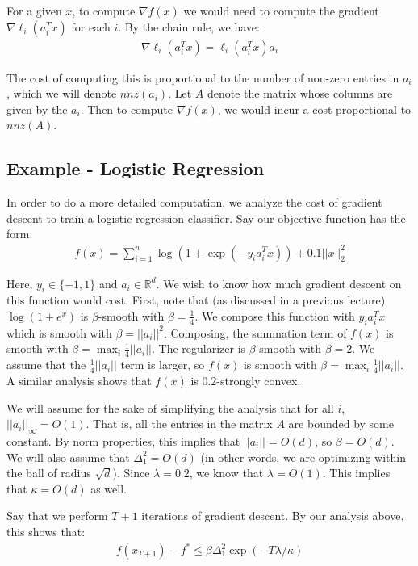 \documentclass[12pt]{report}
\def\real{\mathbb R}
\begin{document}
For a given $x$, to compute $\nabla f(x)$ we would need to compute the gradient $\nabla \ell_i(a_i^Tx)$ for each $i$. By the chain rule, we have:
\begin{align*}
\nabla \ell_i (a_i^Tx) = \ell_i(a_i^Tx)a_i\end{align*}

The cost of computing this is proportional to the number of non-zero entries in $a_i$, which we will denote $nnz(a_i)$. Let $A$ denote the matrix whose columns are given by the $a_i$. Then to compute $\nabla f(x)$, we would incur a cost proportional to $nnz(A)$.

\subsection{Example - Logistic Regression}

In order to do a more detailed computation, we analyze the cost of gradient descent to train a logistic regression classifier. Say our objective function has the form:
\begin{align*}
f(x) = \sum_{i=1}^n \log(1+\exp(-y_ia_i^Tx)) + 0.1||x||_2^2\end{align*}

Here, $y_i \in \{-1,1\}$ and $a_i \in \real^d$. We wish to know how much gradient descent on this function would cost. First, note that (as discussed in a previous lecture) $\log(1+e^x)$ is $\beta$-smooth with $\beta = \frac{1}{4}$. We compose this function with $y_ia_i^Tx$ which is smooth with $\beta = ||a_i||^2$. Composing, the summation term of $f(x)$ is smooth with $\beta = \max_i \frac{1}{4}||a_i||$. The regularizer is $\beta$-smooth with $\beta = 2$. We assume that the $\frac{1}{4}||a_i||$ term is larger, so $f(x)$ is smooth with $\beta = \max_i \frac{1}{4}||a_i||$. A similar analysis shows that $f(x)$ is $0.2$-strongly convex.

\medskip

We will assume for the sake of simplifying the analysis that for all $i$, $||a_i||_\infty = O(1)$. That is, all the entries in the matrix $A$ are bounded by some constant. By norm properties, this implies that $||a_i|| = O(d)$, so $\beta = O(d)$. We will also assume that $\Delta_1^2 = O(d)$ (in other words, we are optimizing within the ball of radius $\sqrt{d}$). Since $\lambda = 0.2$, we know that $\lambda = O(1)$. This implies that $\kappa = O(d)$ as well.

\medskip

Say that we perform $T+1$ iterations of gradient descent. By our analysis above, this shows that:
\begin{align*}
f(x_{T+1}) - f^* \leq \beta\Delta_1^2\exp(-T\lambda/\kappa)\end{align*}
\end{document}
